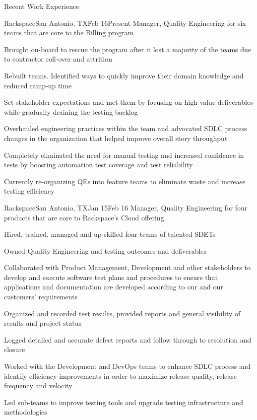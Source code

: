 \documentclass{resume} %
\begin{document}
\begin{rSection}{Recent Work Experience}

\begin{rSubsection}{Rackspace}{San Antonio, TX}{Feb 16}{Present}
{Manager, Quality Engineering for six teams that are core to the Billing program}
  
\item Brought on-board to rescue the program after it lost a majority of the teams due to contractor roll-over and attrition
\item Rebuilt teams. Identified ways to quickly improve their domain knowledge and reduced ramp-up time
\item Set stakeholder expectations and met them by focusing on high value deliverables while gradually draining the testing backlog
\item Overhauled engineering practices within the team and advocated SDLC process changes in the organization that helped improve overall story throughput
\item Completely eliminated the need for manual testing and increased confidence in tests by boosting automation test coverage and test reliability
\item Currently re-organizing QEs into feature teams to eliminate waste and increase testing efficiency
  
\end{rSubsection}
    
\begin{rSubsection}{Rackspace}{San Antonio, TX}{Jan 15}{Feb 16}
{Manager, Quality Engineering for four products that are core to Rackspace's Cloud offering}

\item Hired, trained, managed and up-skilled four teams of talented SDETs
\item Owned Quality Engineering and testing outcomes and deliverables
\item Collaborated with Product Management, Development and other stakeholders to develop and execute software test plans and procedures to ensure that applications and documentation are developed according to our and our customers' requirements
\item Organized and recorded test results, provided reports and general visibility of results and project status
\item Logged detailed and accurate defect reports and follow through to resolution and closure
\item Worked with the Development and DevOps teams to enhance SDLC process and identify efficiency improvements in order to maximize release quality, release frequency and velocity
\item Led sub-teams to improve testing tools and upgrade testing infrastructure and methodologies


\end{rSubsection}
\end{rSection}
\end{document}
